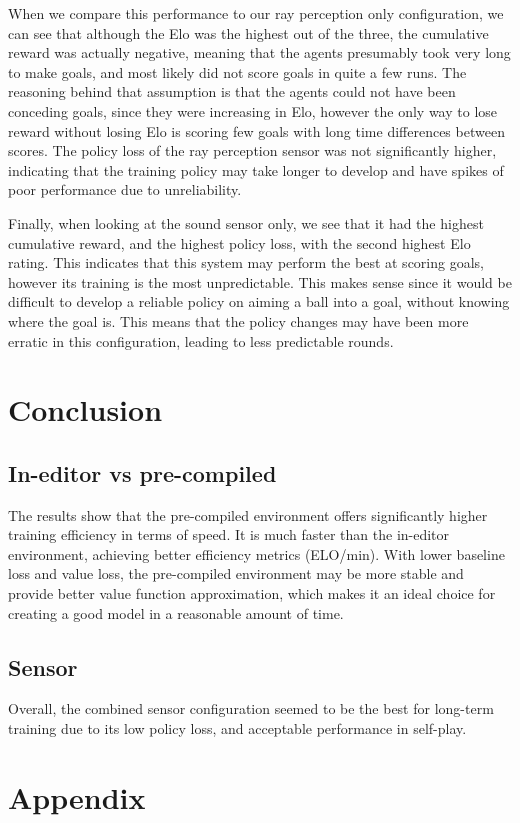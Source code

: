 \documentclass{LSkill}
\begin{document}
When we compare this performance to our ray perception only configuration, we can see that although the Elo was the highest out of the three, the cumulative reward was actually negative, meaning that the agents presumably took very long to make goals, and most likely did not score goals in quite a few runs. The reasoning behind that assumption is that the agents could not have been conceding goals, since they were increasing in Elo, however the only way to lose reward without losing Elo is scoring few goals with long time differences between scores. The policy loss of the ray perception sensor was not significantly higher, indicating that the training policy may take longer to develop and have spikes of poor performance due to unreliability. 

Finally, when looking at the sound sensor only, we see that it had the highest cumulative reward, and the highest policy loss, with the second highest Elo rating. This indicates that this system may perform the best at scoring goals, however its training is the most unpredictable. This makes sense since it would be difficult to develop a reliable policy on aiming a ball into a goal, without knowing where the goal is. This means that the policy changes may have been more erratic in this configuration, leading to less predictable rounds. 
\section{Conclusion}
\subsection{In-editor vs pre-compiled}
The results  show that the pre-compiled environment offers significantly higher training efficiency in terms of speed. It is much faster than the in-editor environment, achieving better efficiency metrics (ELO/min). With lower baseline loss and value loss, the pre-compiled environment may be more stable and provide better value function approximation, which makes it an ideal choice for creating a good model in a reasonable amount of time.
\subsection{Sensor}
Overall, the combined sensor configuration seemed to be the best for long-term training due to its low policy loss, and acceptable performance in self-play. 



\section{Appendix}
\end{document}
